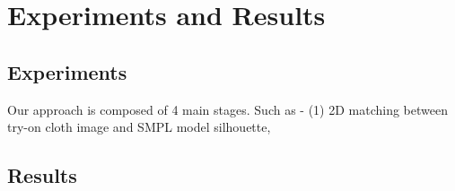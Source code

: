 \section{Experiments and Results }  \label{section:experimentresults}


\subsection{Experiments}

Our approach is composed of 4 main stages. Such as - (1) 2D matching between try-on cloth image and SMPL\cite{Loper2015SMPLAS} model silhouette, 



\subsection{Results}



